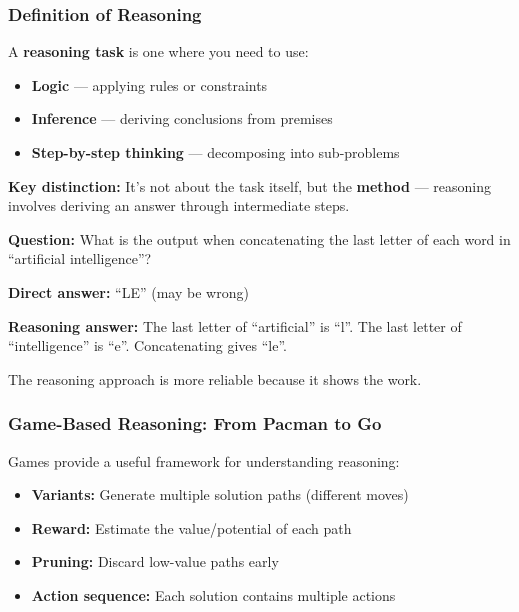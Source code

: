 \bigseparator

\subsubsection{Definition of Reasoning}

\begin{defbox}
A \textbf{reasoning task} is one where you need to use:
\begin{itemize}
  \item \textbf{Logic} --- applying rules or constraints
  \item \textbf{Inference} --- deriving conclusions from premises
  \item \textbf{Step-by-step thinking} --- decomposing into sub-problems
\end{itemize}

\textbf{Key distinction:} It's not about the task itself, but the \textbf{method} --- reasoning involves deriving an answer through intermediate steps.
\end{defbox}

\begin{exbox}
\textbf{Question:} What is the output when concatenating the last letter of each word in ``artificial intelligence''?

\textbf{Direct answer:} ``LE'' (may be wrong)

\textbf{Reasoning answer:} The last letter of ``artificial'' is ``l''. The last letter of ``intelligence'' is ``e''. Concatenating gives ``le''.

The reasoning approach is more reliable because it shows the work.
\end{exbox}

\bigseparator

\subsubsection{Game-Based Reasoning: From Pacman to Go}

Games provide a useful framework for understanding reasoning:

\begin{defbox}
\begin{itemize}
  \item \textbf{Variants:} Generate multiple solution paths (different moves)
  \item \textbf{Reward:} Estimate the value/potential of each path
  \item \textbf{Pruning:} Discard low-value paths early
  \item \textbf{Action sequence:} Each solution contains multiple actions
\end{itemize}
\end{defbox}

